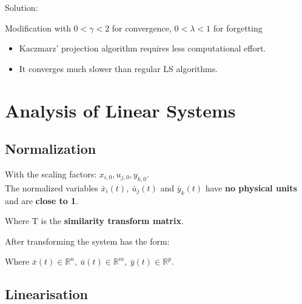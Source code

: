 \documentclass[10pt,a4paper]{scrartcl}
\begin{document}
\begin{multicols*}{3}
Solution:


Modification with $0<\gamma<2$ for convergence, $0<\lambda<1$ for forgetting


\begin{itemize}
\item Kaczmarz' projection algorithm requires less computational effort.
\item It converges much slower than regular LS algorithms.
\end{itemize}

\vfill
\null
\newpage

\section{Analysis of Linear Systems}

\subsection{Normalization}


With the scaling factors: $x_{i,0},u_{j,0},y_{k,0}$. \\
The normalized variables $\bar{x}_i(t),\ \bar{u}_j(t)$ and $\bar{y}_k(t)$ have \textbf{no physical units} and are \textbf{close to 1}.


Where T is the \textbf{similarity transform matrix}.

After transforming the system has the form:


Where $\bar{x}(t)\in\mathbb{R}^n,\ \bar{u}(t)\in\mathbb{R}^m,\ \bar{y}(t)\in\mathbb{R}^p$.

\subsection{Linearisation}


\end{multicols*}
\end{document}
